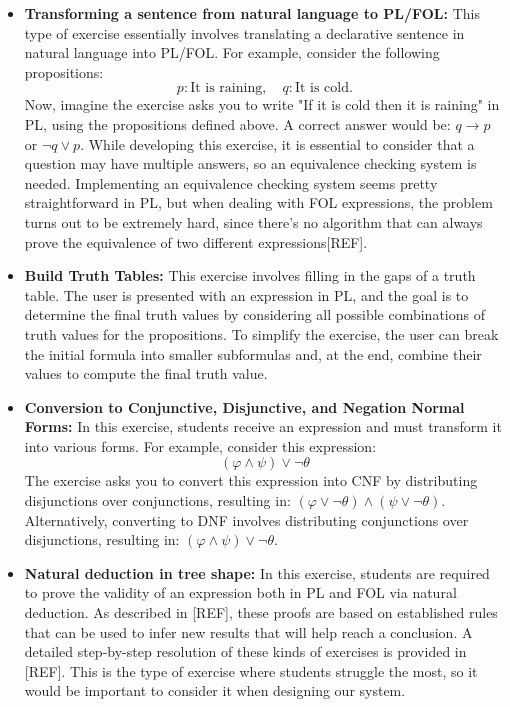 \begin{itemize}
    \item \textbf{Transforming a sentence from natural language to PL/FOL:} This type of exercise essentially involves translating a declarative sentence in natural language into PL/FOL. For example, consider the following propositions:\[p: \text{It is raining}, \quad q: \text{It is cold}.\]
    Now, imagine the exercise asks you to write "If it is cold then it is raining" in PL, using the propositions defined above. A correct answer would be: \(q \rightarrow p\) or \(\neg q \lor p\). While developing this exercise, it is essential to consider that a question may have multiple answers, so an equivalence checking system is needed. Implementing an equivalence checking system seems pretty straightforward in PL, but when dealing with FOL expressions, the problem turns out to be extremely hard, since there's no algorithm that can always prove the equivalence of two different expressions[REF].
    \item \textbf{Build Truth Tables:} This exercise involves filling in the gaps of a truth table. The user is presented with an expression in PL, and the goal is to determine the final truth values by considering all possible combinations of truth values for the propositions. To simplify the exercise, the user can break the initial formula into smaller subformulas and, at the end, combine their values to compute the final truth value.
    \item \textbf{Conversion to Conjunctive, Disjunctive, and Negation Normal Forms:} In this exercise, students receive an expression and must transform it into various forms. For example, consider this expression:\[ (\varphi \land \psi) \lor \neg \theta \]
    The exercise asks you to convert this expression into CNF by distributing disjunctions over conjunctions, resulting in: \( (\varphi \lor \neg \theta) \land (\psi \lor \neg \theta) \). Alternatively, converting to DNF involves distributing conjunctions over disjunctions, resulting in: \( (\varphi \land \psi) \lor \neg \theta \).
    \item \textbf{Natural deduction in tree shape:} In this exercise, students are required to prove the validity of an expression both in PL and FOL via natural deduction. As described in [REF], these proofs are based on established rules that can be used to infer new results that will help reach a conclusion. A detailed step-by-step resolution of these kinds of exercises is provided in [REF]. This is the type of exercise where students struggle the most, so it would be important to consider it when designing our system.
\end{itemize}

